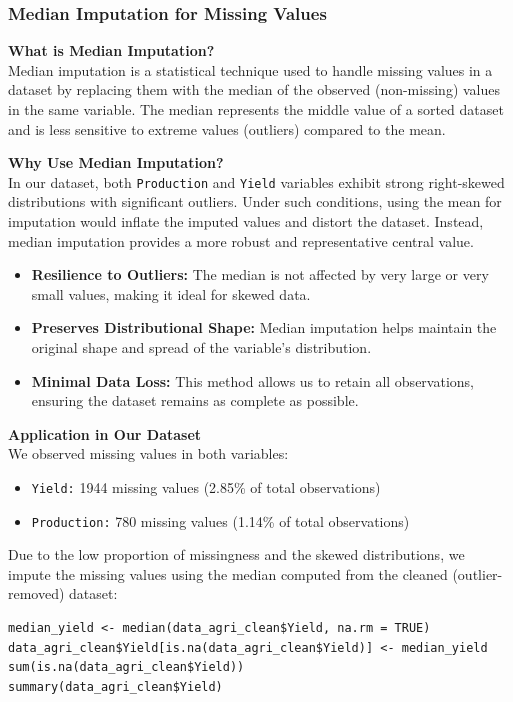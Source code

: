 \subsubsection*{Median Imputation for Missing Values}

\textbf{What is Median Imputation?}\\
Median imputation is a statistical technique used to handle missing values in a dataset by replacing them with the median of the observed (non-missing) values in the same variable. The median represents the middle value of a sorted dataset and is less sensitive to extreme values (outliers) compared to the mean.

\textbf{Why Use Median Imputation?}\\
In our dataset, both \texttt{Production} and \texttt{Yield} variables exhibit strong right-skewed distributions with significant outliers. Under such conditions, using the mean for imputation would inflate the imputed values and distort the dataset. Instead, median imputation provides a more robust and representative central value.

\begin{itemize}
    \item \textbf{Resilience to Outliers:} The median is not affected by very large or very small values, making it ideal for skewed data.
    \item \textbf{Preserves Distributional Shape:} Median imputation helps maintain the original shape and spread of the variable’s distribution.
    \item \textbf{Minimal Data Loss:} This method allows us to retain all observations, ensuring the dataset remains as complete as possible.
\end{itemize}

\textbf{Application in Our Dataset}\\
We observed missing values in both variables:
\begin{itemize}
    \item \texttt{Yield:} 1944 missing values (2.85\% of total observations)
    \item \texttt{Production:} 780 missing values (1.14\% of total observations)
\end{itemize}

Due to the low proportion of missingness and the skewed distributions, we impute the missing values using the median computed from the cleaned (outlier-removed) dataset:

\begin{verbatim}
median_yield <- median(data_agri_clean$Yield, na.rm = TRUE)
data_agri_clean$Yield[is.na(data_agri_clean$Yield)] <- median_yield
sum(is.na(data_agri_clean$Yield))
summary(data_agri_clean$Yield)
\end{verbatim}


